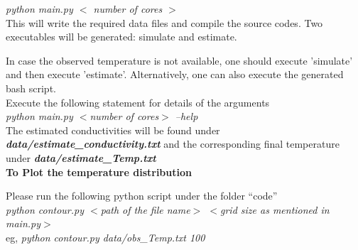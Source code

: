 \documentclass[10pt,a4paper]{report}
\begin{document}
\begin{appendices}
\textit{python main.py $<$ \textit{number of cores} $>$}\\

This will write the required data files and compile the source codes. Two executables will be generated: simulate and estimate. 

In case the observed temperature is not available, one should execute 'simulate' and then execute 'estimate'. Alternatively, one can also execute the generated bash script.\\

Execute the following statement for details of the arguments\\

\textit{python main.py $<$number of cores$>$ --help}\\

The estimated conductivities will be found under \textit{\textbf{data/estimate\_conductivity.txt}} and the corresponding final temperature under \textit{\textbf{data/estimate\_Temp.txt}}\\

\textbf{To Plot the temperature distribution}

Please run the following python script  under the folder “code”\\

\textit{python contour.py $<$path of the file name$>$ $<$grid size as mentioned in main.py$>$ }\\

eg, \textit{python contour.py data/obs\_Temp.txt 100}


%
%
%

\end{appendices}


%
%
%
% 
\end{document}
